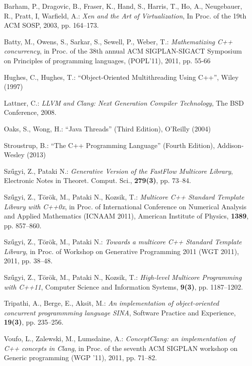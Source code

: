 \documentclass{article}
\begin{document}
\begin{thebibliography}{10}

Barham, P., Dragovic, B., Fraser, K., Hand, S., Harris, T., Ho, A., Neugebauer, R., Pratt, I,
Warfield, A.: \emph{Xen and the Art of Virtualization}, In Proc. of the 19th ACM SOSP, 2003,
pp. 164--173.

Batty, M., Owens, S., Sarkar, S., Sewell, P., Weber, T.: \emph{Mathematizing C++ concurrency},
in Proc. of the 38th annual ACM SIGPLAN-SIGACT Symposium on Principles of programming languages,
(POPL'11), 2011, pp. 55-66

Hughes, C., Hughes, T.: ``Object-Oriented Multithreading Using C++'', Wiley (1997)

Lattner, C.: \emph{{LLVM} and {C}lang: Next Generation Compiler Technology}, The BSD Conference,
2008.

Oaks, S., Wong, H.: ``Java Threads'' (Third Edition), O'Reilly (2004)

Stroustrup, B.: ``The C++ Programming Language'' (Fourth Edition), Addison-Wesley (2013)

Sz\H{u}gyi, Z., Pataki N.: \emph{Generative Version of the FastFlow Multicore Library},
Electronic Notes in Theoret. Comput. Sci., \textbf{279(3)}, pp. 73--84.

Sz\H{u}gyi, Z., T\"or\"ok, M., Pataki N., Kozsik, T.: \emph{Multicore C++ Standard Template Library
with C++0x}, in Proc. of International Conference on Numerical Analysis and Applied
Mathematics (ICNAAM 2011), American Institute of Physics, \textbf{1389}, pp. 857--860.

Sz\H{u}gyi, Z., T\"or\"ok, M., Pataki N.: \emph{Towards a multicore C++ Standard Template Library},
in Proc. of Workshop on Generative Programming 2011 (WGT 2011), 2011, pp. 38--48.

Sz\H{u}gyi, Z., T\"or\"ok, M., Pataki N., Kozsik, T.: \emph{High-level Multicore Programming with C++11},
Computer Science and Information Systems, \textbf{9(3)}, pp. 1187--1202.

Tripathi, A., Berge, E., Aksit, M.: \emph{An implementation of object-oriented concurrent
programmming language SINA}, Software Practice and Experience, \textbf{19(3)}, pp. 235--256.

Voufo, L., Zalewski, M., Lumsdaine, A.: \emph{ConceptClang: an implementation of C++ concepts in Clang},
in Proc. of the seventh ACM SIGPLAN workshop on Generic programming (WGP '11), 2011, pp. 71--82.

\end{thebibliography}
\end{document}
